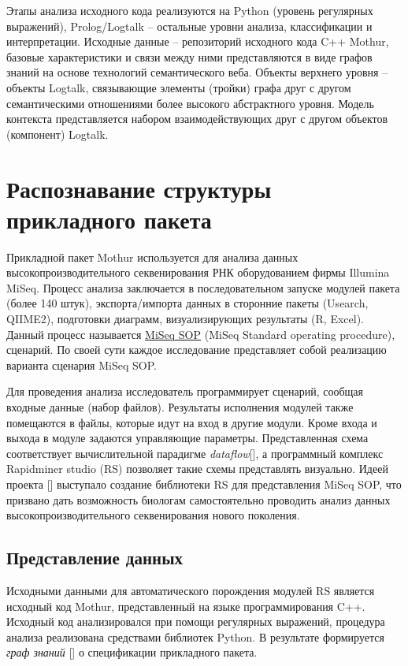 \documentclass[12pt]{article}
\begin{document}
Этапы анализа исходного кода реализуются на Python (уровень регулярных
выражений), Prolog/Logtalk -- остальные уровни анализа, классификации и
интерпретации. Исходные данные -- репозиторий исходного кода C++ Mothur,
базовые характеристики и связи между ними представляются в виде графов
знаний на основе технологий семантического веба. Объекты верхнего уровня
-- объекты Logtalk, связывающие элементы (тройки) графа друг с другом
семантическими отношениями более высокого абстрактного уровня. Модель
контекста представляется набором взаимодействующих друг с другом
объектов (компонент) Logtalk.

\section{Распознавание структуры прикладного пакета}

Прикладной пакет Mothur используется для анализа данных высокопроизводительного секвенирования РНК оборудованием фирмы Illumina MiSeq.  Процесс анализа заключается в последовательном запуске модулей пакета (более 140 штук), экспорта/импорта данных в сторонние пакеты (Usearch, QIIME2), подготовки диаграмм, визуализирующих результаты (R, Excel).  Данный процесс называется \href{https://mothur.org/wiki/miseq_sop/}{MiSeq SOP} (MiSeq Standard operating procedure), сценарий.  По своей сути каждое исследование представляет собой реализацию варианта сценария MiSeq SOP.

Для проведения анализа исследователь программирует сценарий, сообщая входные данные (набор файлов).  Результаты исполнения модулей также помещаются в файлы, которые идут на вход в другие модули.  Кроме входа и выхода в модуле задаются управляющие параметры.  Представленная схема соответствует вычислительной парадигме \emph{dataflow}[], а программный комплекс Rapidminer studio (RS) позволяет такие схемы представлять визуально.  Идеей проекта [] выступало создание библиотеки RS для представления MiSeq SOP, что призвано дать возможность биологам самостоятельно проводить анализ данных высокопроизводительного секвенирования нового поколения.

\subsection{Представление данных}

Исходными данными для автоматического порождения модулей RS является исходный код Mothur, представленный на языке программирования C++.  Исходный код анализировался при помощи регулярных выражений, процедура анализа реализована средствами библиотек Python.  В результате формируется \emph{граф знаний} [] о спецификации прикладного пакета.
\end{document}
